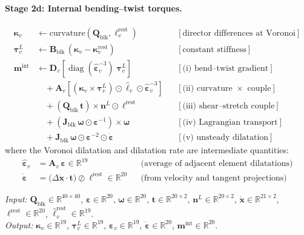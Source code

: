 \documentclass[11pt]{article}
\newcommand{\vect}[1]{\mathbf{#1}}
\newcommand{\mat}[1]{\mathbf{#1}}
\newcommand{\Real}{\mathbb{R}}
\begin{document}
\paragraph{Stage 2d: Internal bending--twist torques.}
\begin{equation}
  \boxed{\;
  \begin{aligned}
    \bm{\kappa}_v &\leftarrow \text{curvature}(\mat{Q}_{\text{blk}}, \bm{\ell}_v^{\text{rest}})
      && [\text{director differences at Voronoi}] \\
    \bm{\tau}_v^L &\leftarrow \mat{B}_{\text{blk}}\,(\bm{\kappa}_v - \bm{\kappa}_v^{\text{rest}})
      && [\text{constant stiffness}] \\[6pt]
    \vect{m}^{\text{int}} &\leftarrow
      \mat{D}_v\!\left[\operatorname{diag}(\hat{\bm{\varepsilon}}_v^{-3})\;\bm{\tau}_v^L\right]
      && [\text{(i) bend--twist gradient}] \\
    &\quad + \mat{A}_v\!\left[(\bm{\kappa}_v \times \bm{\tau}_v^L) \odot \hat{\bm{\ell}}_v \odot \hat{\bm{\varepsilon}}_v^{-3}\right]
      && [\text{(ii) curvature $\times$ couple}] \\
    &\quad + (\mat{Q}_{\text{blk}}\,\vect{t}) \times \vect{n}^L \odot \bm{\ell}^{\text{rest}}
      && [\text{(iii) shear--stretch couple}] \\
    &\quad + (\mat{J}_{\text{blk}}\,\bm{\omega} \odot \bm{\varepsilon}^{-1}) \times \bm{\omega}
      && [\text{(iv) Lagrangian transport}] \\
    &\quad + \mat{J}_{\text{blk}}\,\bm{\omega} \odot \bm{\varepsilon}^{-2} \odot \dot{\bm{\varepsilon}}
      && [\text{(v) unsteady dilatation}]
  \end{aligned}
  \;}
  \label{eq:mat-torque}
\end{equation}
\noindent
where the Voronoi dilatation and dilatation rate are intermediate quantities:
\begin{align}
  \hat{\bm{\varepsilon}}_v &= \mat{A}_v\,\bm{\varepsilon} \in \Real^{19}
    && \text{(average of adjacent element dilatations)}
  \label{eq:voronoi-dilatation} \\
  \dot{\bm{\varepsilon}} &= \bigl(\Delta\dot{\vect{x}} \cdot \vect{t}\bigr) \oslash \bm{\ell}^{\text{rest}} \in \Real^{20}
    && \text{(from velocity and tangent projections)}
  \label{eq:dilatation-rate}
\end{align}

\textit{Input:} $\mat{Q}_{\text{blk}} \in \Real^{40 \times 40}$, $\bm{\varepsilon} \in \Real^{20}$, $\bm{\omega} \in \Real^{20}$, $\vect{t} \in \Real^{20 \times 2}$, $\vect{n}^L \in \Real^{20 \times 2}$, $\dot{\vect{x}} \in \Real^{21 \times 2}$, $\bm{\ell}^{\text{rest}} \in \Real^{20}$, $\hat{\bm{\ell}}_v^{\text{rest}} \in \Real^{19}$. \\
\textit{Output:} $\bm{\kappa}_v \in \Real^{19}$, $\bm{\tau}_v^L \in \Real^{19}$, $\hat{\bm{\varepsilon}}_v \in \Real^{19}$, $\dot{\bm{\varepsilon}} \in \Real^{20}$, $\vect{m}^{\text{int}} \in \Real^{20}$.
\end{document}
